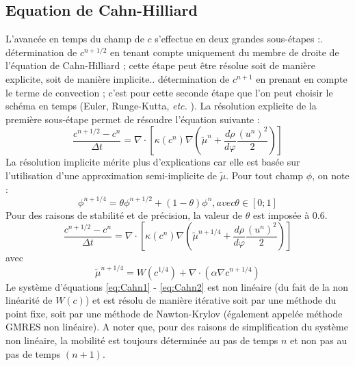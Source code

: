 \subsection{Equation de Cahn-Hilliard}
L'avanc\'ee en temps du champ de $c$ s'effectue en deux grandes sous-\'etapes :\smallskip{}. d\'etermination de $c^{n+1/2}$ en tenant compte uniquement du membre de droite de l'\'equation de Cahn-Hilliard ; cette \'etape peut \^etre r\'esolue soit de
mani\`ere explicite, soit de mani\`ere implicite.\smallskip{}. d\'etermination de $c^{n+1}$ en prenant en compte le terme de convection ; c'est pour cette seconde \'etape que l'on peut choisir le sch\'ema en temps (Euler,
Runge-Kutta, \textit{etc.} ).\smallskip\newline
La r\'esolution explicite de la premi\`ere sous-\'etape permet de r\'esoudre l'\'equation suivante :\newline
\begin{equation}
\frac{c^{n+1/2}-c^n}{\Delta t}=\nabla\cdot\left[\kappa\left(c^n\right)\nabla\left(\tilde{\mu}^n+\frac{d\rho}{d\varphi}\frac{\left(u^n\right)^2}{2}\right)\right]
\end{equation}
La r\'esolution implicite m\'erite plus d'explications car elle est bas\'ee sur l'utilisation d'une approximation semi-implicite de $\tilde{\mu}$. Pour tout champ
$\phi$, on note :
\begin{equation}
\phi^{n+1/4}=\theta\phi^{n+1/2}+\left(1-\theta\right)\phi^{n}, avec \theta \in \left[0;1\right]
\end{equation}
Pour des raisons de stabilit\'e et de pr\'ecision, la valeur de $\theta$ est impos\'ee \`a 0.6.
\begin{equation}
\frac{c^{n+1/2}-c^n}{\Delta
t}=\nabla\cdot\left[\kappa\left(c^n\right)\nabla\left(\tilde{\mu}^{n+1/4}+\frac{d\rho}{d\varphi}\frac{\left(u^n\right)^2}{2}\right)\right]\label{eq:Cahn1}
\end{equation}
avec
\begin{equation}
\tilde{\mu}^{n+1/4}=W\left(c^{1/4}\right)+\nabla\cdot\left(\alpha\nabla c^{n+1/4}\right)\label{eq:Cahn2}
\end{equation}
Le syst\`eme d'\'equations \ref{eq:Cahn1} - \ref{eq:Cahn2} est non lin\'eaire (du fait de la non lin\'earit\'e de $W(c)$) et est r\'esolu de
mani\`ere it\'erative soit par une m\'ethode du point fixe, soit par une m\'ethode de Nawton-Krylov (\'egalement appel\'ee m\'ethode GMRES non
lin\'eaire). A noter que, pour des raisons de simplification du syst\`eme non lin\'eaire, la mobilit\'e est toujours d\'etermin\'ee au pas de
temps $n$ et non pas au pas de temps $(n+1)$.

